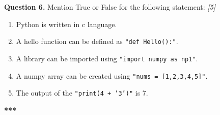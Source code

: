 \documentclass[11pt,a4paper]{article}
\newcommand{\pts}[1]{\hfill \textit{[#1]}}
\begin{document}
\bigskip

\noindent \textbf{Question 6.} Mention True or False for the following statement: \pts{5}
\begin{enumerate}[label=\alph*)]
  \item Python is written in c language.
  \item A hello function can be defined as \texttt{"def Hello():"}.
  \item A library can be imported using \texttt{"import numpy as np1"}.
  \item A numpy array can be created using \texttt{"nums = [1,2,3,4,5]"}.
  \item The output of the \texttt{"print(4 + '3')"} is 7.
\end{enumerate}

\bigskip
\begin{center}
  \textbf{***}
\end{center}
\end{document}
